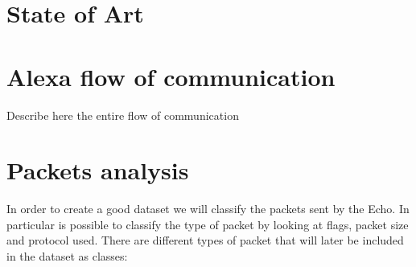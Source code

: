 \documentclass[sigconf]{acmart}
\begin{document}
    \section{State of Art}


    \section{Alexa flow of communication}
    Describe here the entire flow of communication


    \section{Packets analysis}
    In order to create a good dataset we will classify the packets sent by the Echo.
    In particular is possible to classify the type of packet by looking at flags, packet size and protocol used.
    There are different types of packet that will later be included in the dataset as classes:
\end{document}
